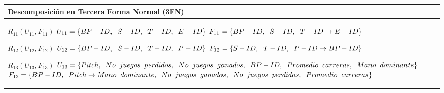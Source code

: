 \documentclass{report}
\begin{document}
    \begin{tabularx}{\textwidth}{|X|}
        \toprule
        \hfil \textbf{Descomposición en Tercera Forma Normal (3FN)} \\
        \midrule
        
        $ R_{11} ( U_{11} , F_{11} ) $ \newline 
        $ U_{11} = \{{BP-ID, \hspace{0.2cm}  S-ID, \hspace{0.2cm}  T-ID, \hspace{0.2cm}  E-ID}\} $ \newline 
        $ F_{11} = \{BP-ID, \hspace{0.2cm} S-ID, \hspace{0.2cm} T-ID \rightarrow E-ID \} $\newline 
        
        $ R_{12} ( U_{12} , F_{12} ) $ \newline 
        $ U_{12} = \{{BP-ID, \hspace{0.2cm}  S-ID, \hspace{0.2cm}  T-ID, \hspace{0.2cm}  P-ID}\} $ \newline 
        $ F_{12} = \{S-ID, \hspace{0.2cm} T-ID, \hspace{0.2cm} P-ID \rightarrow BP-ID \} $ \newline

        $ R_{13} ( U_{13} , F_{13} ) $ \newline 
        $ U_{13} = \{{Pitch, \hspace{0.2cm}  No \hspace{0.2cm} juegos \hspace{0.2cm} perdidos, \hspace{0.2cm}  No \hspace{0.2cm} juegos \hspace{0.2cm} ganados, \hspace{0.2cm}  BP-ID, \hspace{0.2cm}  Promedio \hspace{0.2cm} carreras, \hspace{0.2cm}  Mano \hspace{0.2cm} dominante}\} $ \newline 
        $ F_{13} = \{BP-ID, \hspace{0.2cm} Pitch \rightarrow Mano \hspace{0.2cm} dominante, \hspace{0.2cm} No \hspace{0.2cm} juegos \hspace{0.2cm} ganados, \hspace{0.2cm} No \hspace{0.2cm} juegos \hspace{0.2cm} perdidos, \hspace{0.2cm} Promedio \hspace{0.2cm} carreras \} $\newline 
        

\end{tabularx}
\end{document}
